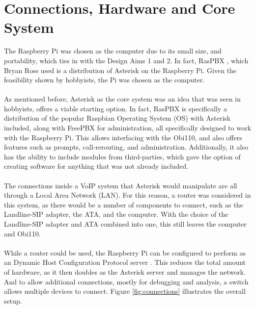 \documentclass[main.tex]{subfiles}
\begin{document}
\section{Connections, Hardware and Core System}
The Raspberry Pi was chosen as the computer due to its small size, and portability, which ties in with the Design Aims 1 and 2. In fact, RasPBX \cite{raspbx}, which Bryan Ross used \cite{bryanross} is a distribution of Asterisk on the Raspberry Pi. Given the feasibility shown by hobbyists, the Pi was chosen as the computer.
\\\\
As mentioned before, Asterisk as the core system was an idea that was seen in hobbyists, offers a viable starting option. In fact, RasPBX \cite{raspbx} is specifically a distribution of the popular Raspbian Operating System (OS) with Asterisk included, along with FreePBX for administration, all specifically designed to work with the Raspberry Pi. This allows interfacing with the Obi110, and also offers features such as prompts, call-rerouting, and administration. Additionally, it also has the ability to include modules from third-parties, which gave the option of creating software for anything that was not already included.
\\\\
The connections inside a VoIP system that Asterisk would manipulate are all through a Local Area Network (LAN). For this reason, a router was considered in this system, as there would be a number of components to connect, such as the Landline-SIP adapter, the ATA, and the computer. With the choice of the Landline-SIP adapter and ATA combined into one, this still leaves the computer and Obi110.
\\\\
While a router could be used, the Raspberry Pi can be configured to perform as an Dynamic Host Configuration Protocol server \cite{pi-dhcp}. This reduces the total amount of hardware, as it then doubles as the Asterisk server and manages the network. And to allow additional connections, mostly for debugging and analysis, a switch allows multiple devices to connect. Figure \ref{fig:connections} illustrates the overall setup.
\end{document}
